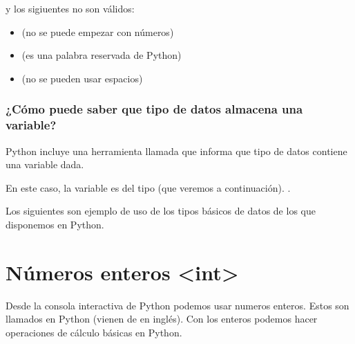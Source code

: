 \documentclass[a4paper,12pt,spanish]{sphinxmanual}
\begin{document}
\sphinxAtStartPar
y los sigiuentes no son válidos:
\begin{itemize}
\item {} 
\sphinxAtStartPar
{} (no se puede empezar con números)

\item {} 
\sphinxAtStartPar
{}  (es una palabra reservada de Python)

\item {} 
\sphinxAtStartPar
{} (no se pueden usar espacios)

\end{itemize}


\subsection{¿Cómo puede saber que tipo de datos almacena una variable?}
\label{\detokenize{interactivo:como-puede-saber-que-tipo-de-datos-almacena-una-variable}}
\sphinxAtStartPar
Python incluye una herramienta llamada  que informa
que tipo de datos contiene una variable dada.

\begin{sphinxVerbatim}[commandchars=\\\{\}]
  
\end{sphinxVerbatim}

\sphinxAtStartPar
En este caso, la variable  es del tipo  (que veremos a continuación).
.

\sphinxAtStartPar
Los siguientes son ejemplo de uso de los tipos básicos de datos de los que
disponemos en Python.

\sphinxstepscope


\chapter{Números enteros \textless{}int\textgreater{}}
\label{\detokenize{int:numeros-enteros-int}}\label{\detokenize{int::doc}}
\sphinxAtStartPar
Desde la consola interactiva de Python podemos usar numeros enteros.
Estos son llamados  en Python (vienen de  en inglés).
Con los enteros podemos hacer operaciones de cálculo básicas en Python.
\end{document}
